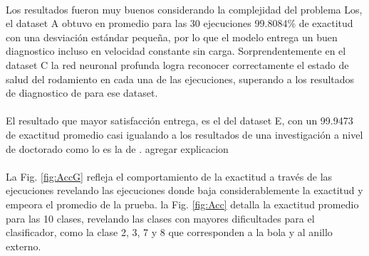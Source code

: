 \documentclass[12pt]{article}%
\begin{document}
\paragraph{}
Los resultados fueron muy buenos considerando la complejidad del problema
Los, el dataset A obtuvo en promedio para las 30 ejecuciones 99.8084\% de exactitud con una desviación estándar pequeña, por lo que el modelo entrega un buen diagnostico incluso en velocidad constante sin carga. Sorprendentemente en el dataset C la red neuronal profunda logra reconocer correctamente el estado de salud del rodamiento en cada una de las ejecuciones, superando a los resultados de diagnostico de \cite{jia} para ese dataset. 

\paragraph{}
El resultado que mayor satisfacción entrega, es el del dataset E, con un 99.9473 de exactitud promedio casi igualando a los resultados de una investigación a nivel de doctorado como lo es la de \cite{jia}. agregar explicacion

\paragraph{}
La Fig. \ref{fig:AccG} refleja el comportamiento de la exactitud a través de las ejecuciones revelando las ejecuciones donde baja considerablemente la exactitud y empeora el promedio de la prueba. la Fig. \ref{fig:Acc} detalla la exactitud promedio para las 10 clases, revelando las clases con mayores dificultades para el clasificador, como la clase 2, 3, 7 y 8 que corresponden a la bola y al anillo externo.

\begin{table}
\centering
{}
\caption{Resultados del testing para cada dataset.}
\label{table:results}
\end{table}
\end{document}
